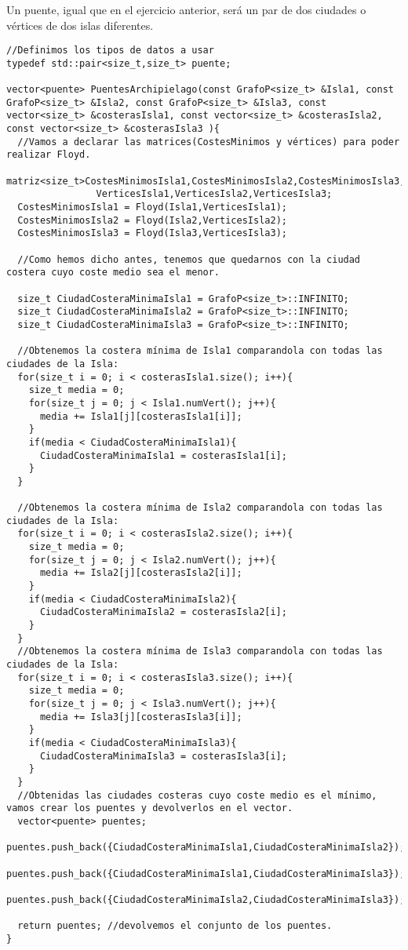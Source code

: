 Un puente, igual que en el ejercicio anterior, será un par de dos ciudades o vértices de dos islas diferentes.

\begin{verbatim}
//Definimos los tipos de datos a usar
typedef std::pair<size_t,size_t> puente;

vector<puente> PuentesArchipielago(const GrafoP<size_t> &Isla1, const GrafoP<size_t> &Isla2, const GrafoP<size_t> &Isla3, const vector<size_t> &costerasIsla1, const vector<size_t> &costerasIsla2, const vector<size_t> &costerasIsla3 ){
  //Vamos a declarar las matrices(CostesMinimos y vértices) para poder realizar Floyd.
  matriz<size_t>CostesMinimosIsla1,CostesMinimosIsla2,CostesMinimosIsla3,
                VerticesIsla1,VerticesIsla2,VerticesIsla3;
  CostesMinimosIsla1 = Floyd(Isla1,VerticesIsla1);
  CostesMinimosIsla2 = Floyd(Isla2,VerticesIsla2);
  CostesMinimosIsla3 = Floyd(Isla3,VerticesIsla3);

  //Como hemos dicho antes, tenemos que quedarnos con la ciudad costera cuyo coste medio sea el menor.

  size_t CiudadCosteraMinimaIsla1 = GrafoP<size_t>::INFINITO;
  size_t CiudadCosteraMinimaIsla2 = GrafoP<size_t>::INFINITO;
  size_t CiudadCosteraMinimaIsla3 = GrafoP<size_t>::INFINITO;

  //Obtenemos la costera mínima de Isla1 comparandola con todas las ciudades de la Isla:
  for(size_t i = 0; i < costerasIsla1.size(); i++){
    size_t media = 0;
    for(size_t j = 0; j < Isla1.numVert(); j++){
      media += Isla1[j][costerasIsla1[i]];
    }
    if(media < CiudadCosteraMinimaIsla1){
      CiudadCosteraMinimaIsla1 = costerasIsla1[i];
    }
  }

  //Obtenemos la costera mínima de Isla2 comparandola con todas las ciudades de la Isla:
  for(size_t i = 0; i < costerasIsla2.size(); i++){
    size_t media = 0;
    for(size_t j = 0; j < Isla2.numVert(); j++){
      media += Isla2[j][costerasIsla2[i]];
    }
    if(media < CiudadCosteraMinimaIsla2){
      CiudadCosteraMinimaIsla2 = costerasIsla2[i];
    }
  }
  //Obtenemos la costera mínima de Isla3 comparandola con todas las ciudades de la Isla:
  for(size_t i = 0; i < costerasIsla3.size(); i++){
    size_t media = 0;
    for(size_t j = 0; j < Isla3.numVert(); j++){
      media += Isla3[j][costerasIsla3[i]];
    }
    if(media < CiudadCosteraMinimaIsla3){
      CiudadCosteraMinimaIsla3 = costerasIsla3[i];
    }
  }
  //Obtenidas las ciudades costeras cuyo coste medio es el mínimo, vamos crear los puentes y devolverlos en el vector.
  vector<puente> puentes;
  puentes.push_back({CiudadCosteraMinimaIsla1,CiudadCosteraMinimaIsla2});
  puentes.push_back({CiudadCosteraMinimaIsla1,CiudadCosteraMinimaIsla3});
  puentes.push_back({CiudadCosteraMinimaIsla2,CiudadCosteraMinimaIsla3});

  return puentes; //devolvemos el conjunto de los puentes.
}
\end{verbatim}
